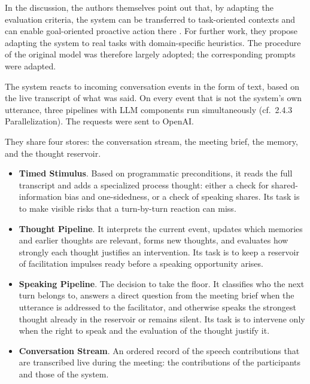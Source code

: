 In the discussion, the authors themselves point out that, by adapting the evaluation criteria, the system
can be transferred to task-oriented contexts and can enable goal-oriented proactive action there
\cite["8.2 Apllying Inner Thougs Beyond Casual
Conversations"]{liuProactiveConversationalAgents2025}.
For further work, they propose adapting the system to real tasks with domain-specific heuristics.
The procedure of the original model was therefore largely adopted; the corresponding prompts were adapted.

The system reacts to incoming conversation events in the form of text, based on the live transcript of
what was said.
On every event that is not the system's own utterance, three pipelines with LLM components run
simultaneously (cf.\ 2.4.3 Parallelization). The requests were sent to OpenAI.

They share four stores: the conversation stream, the meeting brief, the memory, and the
thought reservoir.

\begin{itemize}
  \item \textbf{Timed Stimulus}.
    Based on programmatic preconditions, it reads the full transcript and adds a specialized
    process thought: either a check for shared-information bias and one-sidedness, or a check of
    speaking shares.
    Its task is to make visible risks that a turn-by-turn reaction can miss.
  \item \textbf{Thought Pipeline}.
    It interprets the current event, updates which memories and earlier thoughts are relevant,
    forms new thoughts, and evaluates how strongly each thought justifies an intervention.
    Its task is to keep a reservoir of facilitation impulses ready before a
    speaking opportunity arises.
  \item \textbf{Speaking Pipeline}.
    The decision to take the floor.
    It classifies who the next turn belongs to, answers a direct question from the meeting brief
    when the utterance is addressed to the facilitator, and otherwise speaks the strongest thought
    already in the reservoir or remains silent.
    Its task is to intervene only when the right to speak and the evaluation of the thought
    justify it.
  \item \textbf{Conversation Stream}.
    An ordered record of the speech contributions that are transcribed live during the meeting:
    the contributions of the participants and those of the system.
\end{itemize}

